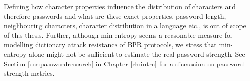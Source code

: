 
\begin{remark}
Defining how character properties influence the distribution \DD of characters and therefore passwords and what are these exact properties, \eg password length, neighbouring characters, character distribution in a language etc., is out of scope of this thesis.
Further, although min-entropy seems a reasonable measure for modelling dictionary attack resistance of \ac{BPR} protocols,
we stress that min-entropy alone might not be sufficient to estimate the real password strength. 
See Section \ref{sec:passwordresearch} in Chapter \ref{ch:intro} for a discussion on password strength metrics.
\end{remark}

